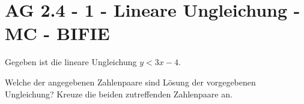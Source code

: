 \section{AG 2.4 - 1 - Lineare Ungleichung  - MC - BIFIE}

\begin{beispiel}[AG 2.4]{1} %
Gegeben ist die lineare Ungleichung $y<3x-4$.

\leer

Welche der angegebenen Zahlenpaare sind Lösung der vorgegebenen Ungleichung? Kreuze die beiden zutreffenden Zahlenpaare an.  

\end{beispiel}